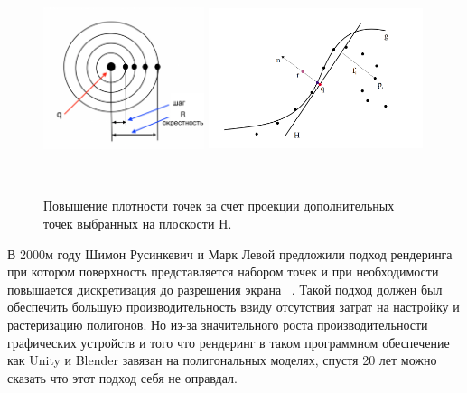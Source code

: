 \begin{figure}[h]
  \centering
  \includegraphics[width=0.42\textwidth, height=6cm]{images/rendering.png}
  \includegraphics[width=0.56\textwidth, height=6cm]{images/0.png}
  \caption{Повышение плотности точек за счет проекции дополнительных точек выбранных на плоскости H.}
  \label{fig:upsampling}
\end{figure}

В 2000м году Шимон Русинкевич и Марк Левой предложили подход рендеринга при котором поверхность представляется набором точек и при необходимости повышается дискретизация до разрешения экрана ~\cite{Szymon}. Такой подход должен был обеспечить большую производительность ввиду отсутствия затрат на настройку и растеризацию полигонов. Но из-за значительного роста производительности графических устройств и того что рендеринг в таком программном обеспечение как Unity и Blender завязан на полигональных моделях, спустя 20 лет можно сказать что этот подход себя не оправдал.


